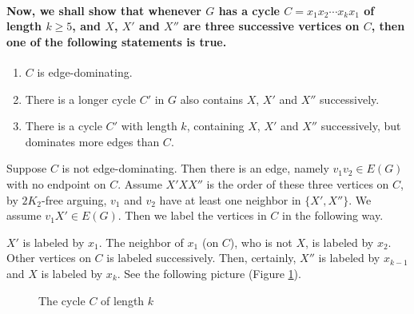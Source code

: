 \documentclass[12pt]{report}
\begin{document}
\paragraph{Now, we shall show that whenever $G$ has a cycle $C=x_1x_2\cdots x_kx_1$ of length $k\ge5$, and $X$, $X'$ and $X''$ are three successive vertices on $C$, then one of the following statements is true.}
\begin{enumerate}
\item $C$ is edge-dominating.
\item There is a longer cycle $C'$ in $G$ also contains $X$, $X'$ and $X''$ successively.
\item There is a cycle $C'$ with length $k$, containing $X$, $X'$ and $X''$ successively, but dominates more edges than $C$.
\end{enumerate}

Suppose $C$ is not edge-dominating. Then there is an edge, namely $v_1v_2\in E(G)$ with no endpoint on $C$. Assume $X'XX''$ is the order of these three vertices on $C$, by $2K_2$-free arguing, $v_1$ and $v_2$ have at least one neighbor in $\{X',X''\}$. We assume $v_1X'\in E(G)$. Then we label the vertices in $C$ in the following way.

$X'$ is labeled by $x_1$. The neighbor of $x_1$ (on $C$), who is not $X$, is labeled by $x_2$. Other vertices on $C$ is labeled successively. Then, certainly, $X''$ is labeled by $x_{k-1}$ and $X$ is labeled by $x_k$. See the following picture (Figure \ref{labelcycle}).

\begin{figure}[h]
\begin{center}
\caption{The cycle $C$ of length $k$}\label{labelcycle}
\end{center}
\end{figure}
\end{document}
